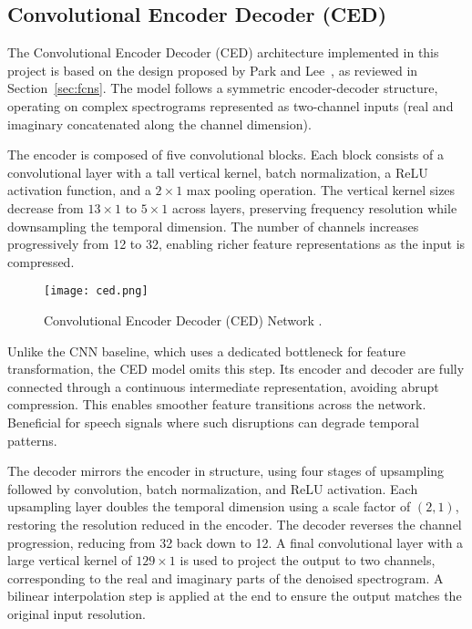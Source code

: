 \subsection{Convolutional Encoder Decoder (CED)}
\label{sec:ced}

The Convolutional Encoder Decoder (CED) architecture implemented in this project is based on the design proposed by Park and Lee~\cite{park2017acoustic}, as reviewed in Section~\ref{sec:fcns}. The model follows a symmetric encoder-decoder structure, operating on complex spectrograms represented as two-channel inputs (real and imaginary concatenated along the channel dimension).

The encoder is composed of five convolutional blocks. Each block consists of a convolutional layer with a tall vertical kernel, batch normalization, a ReLU activation function, and a \(2 \times 1\) max pooling operation. The vertical kernel sizes decrease from \(13 \times 1\) to \(5 \times 1\) across layers, preserving frequency resolution while downsampling the temporal dimension. The number of channels increases progressively from 12 to 32, enabling richer feature representations as the input is compressed.

\begin{figure}[h]
    \centering
    \texttt{[image: ced.png]}
    \caption{\label{fig:ced}Convolutional Encoder Decoder (CED) Network \cite{park2017acoustic}.}
\end{figure}

Unlike the CNN baseline, which uses a dedicated bottleneck for feature transformation, the CED model omits this step. Its encoder and decoder are fully connected through a continuous intermediate representation, avoiding abrupt compression. This enables smoother feature transitions across the network. Beneficial for speech signals where such disruptions can degrade temporal patterns.

The decoder mirrors the encoder in structure, using four stages of upsampling followed by convolution, batch normalization, and ReLU activation. Each upsampling layer doubles the temporal dimension using a scale factor of \((2, 1)\), restoring the resolution reduced in the encoder. The decoder reverses the channel progression, reducing from 32 back down to 12. A final convolutional layer with a large vertical kernel of \(129 \times 1\) is used to project the output to two channels, corresponding to the real and imaginary parts of the denoised spectrogram. A bilinear interpolation step is applied at the end to ensure the output matches the original input resolution.


